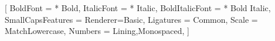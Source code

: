 \setmonofont{Libertinus Mono}
		[
			BoldFont          = {* Bold},
  			ItalicFont        = {* Italic},
  			BoldItalicFont    = {* Bold Italic},
			SmallCapsFeatures = {Renderer=Basic},
			Ligatures         = {Common},
			Scale             = MatchLowercase,
			Numbers           = {Lining,Monospaced},
		]